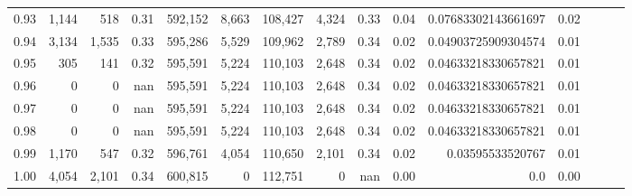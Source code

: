 \begin{tabular}{rrrrrrrrrrrrrrr}
0.93 &   1,144 &     518 &  0.31 &  592,152 &    8,663 &  108,427 &    4,324 &  0.33 &  0.04 &  0.07683302143661697 &      0.02 \\
0.94 &   3,134 &   1,535 &  0.33 &  595,286 &    5,529 &  109,962 &    2,789 &  0.34 &  0.02 &  0.04903725909304574 &      0.01 \\
0.95 &     305 &     141 &  0.32 &  595,591 &    5,224 &  110,103 &    2,648 &  0.34 &  0.02 &  0.04633218330657821 &      0.01 \\
0.96 &       0 &       0 &   nan &  595,591 &    5,224 &  110,103 &    2,648 &  0.34 &  0.02 &  0.04633218330657821 &      0.01 \\
0.97 &       0 &       0 &   nan &  595,591 &    5,224 &  110,103 &    2,648 &  0.34 &  0.02 &  0.04633218330657821 &      0.01 \\
0.98 &       0 &       0 &   nan &  595,591 &    5,224 &  110,103 &    2,648 &  0.34 &  0.02 &  0.04633218330657821 &      0.01 \\
0.99 &   1,170 &     547 &  0.32 &  596,761 &    4,054 &  110,650 &    2,101 &  0.34 &  0.02 &     0.03595533520767 &      0.01 \\
1.00 &   4,054 &   2,101 &  0.34 &  600,815 &        0 &  112,751 &        0 &   nan &  0.00 &                  0.0 &      0.00 \\
\bottomrule
\end{tabular}
